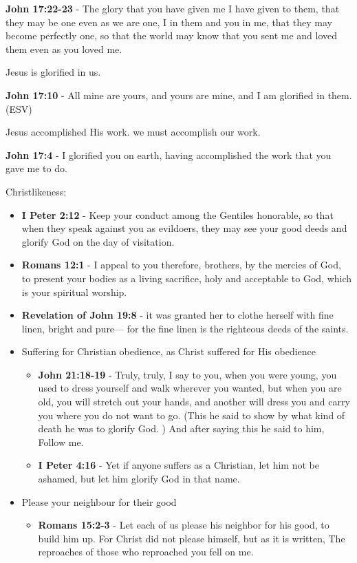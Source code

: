 \documentclass[11pt]{article}
\begin{document}
\textbf{John 17:22-23} - The glory that you have given me I have given to them, that they may be one even as we are one, I in them and you in me, that they may become perfectly one, so that the world may know that you sent me and loved them even as you loved me.

Jesus is glorified in us.

\textbf{John 17:10} - All mine are yours, and yours are mine, and I am glorified in them. (ESV)

Jesus accomplished His work.
we must accomplish our work.

\textbf{John 17:4} - I glorified you on earth, having accomplished the work that you gave me to do.

Christlikeness:
\begin{itemize}
\item \textbf{I Peter 2:12} - Keep your conduct among the Gentiles honorable, so that when they speak against you as evildoers, they may see your good deeds and glorify God on the day of visitation.

\item \textbf{Romans 12:1} - I appeal to you therefore, brothers, by the mercies of God, to present your bodies as a living sacrifice, holy and acceptable to God, which is your spiritual worship.

\item \textbf{Revelation of John 19:8} - it was granted her to clothe herself with fine linen, bright and pure— for the fine linen is the righteous deeds of the saints.

\item Suffering for Christian obedience, as Christ suffered for His obedience
\begin{itemize}
\item \textbf{John 21:18-19} - Truly, truly, I say to you, when you were young, you used to dress yourself and walk wherever you wanted, but when you are old, you will stretch out your hands, and another will dress you and carry you where you do not want to go. (This he said to show by what kind of death he was to glorify God. ) And after saying this he said to him, Follow me.
\item \textbf{I Peter 4:16} - Yet if anyone suffers as a Christian, let him not be ashamed, but let him glorify God in that name.
\end{itemize}

\item Please your neighbour for their good
\begin{itemize}
\item \textbf{Romans 15:2-3} - Let each of us please his neighbor for his good, to build him up. For Christ did not please himself, but as it is written, The reproaches of those who reproached you fell on me.
\end{itemize}


\end{itemize}
\end{document}
